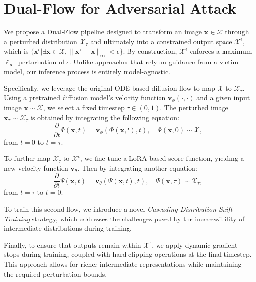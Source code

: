 \section{Dual-Flow for Adversarial Attack}


We propose a Dual-Flow pipeline designed to transform an image $\mathbf{x} \in \mathcal{X}$ through a perturbed distribution $\mathcal{X}_\tau$ and ultimately into a constrained output space $\mathcal{X}^\epsilon$, which is $\{\mathbf{x}^\epsilon | \exists \mathbf{x}\in \mathcal{X}, \|\mathbf{x^\epsilon - \mathbf{x}}\|_\infty < \epsilon\}$. By construction, $\mathcal{X}^\epsilon$ enforces a maximum $\ell_\infty$ perturbation of $\epsilon$. Unlike approaches that rely on guidance from a victim model, our inference process is entirely model-agnostic.

Specifically, we leverage the original ODE-based diffusion flow to map $\mathcal{X}$ to $\mathcal{X}_\tau$. Using a pretrained diffusion model's velocity function $\mathbf{v}_\phi(\cdot,\cdot)$ and a given input image $\mathbf{x} \sim \mathcal{X}$, we select a fixed timestep $\tau \in (0,1)$. The perturbed image $\mathbf{x}_\tau \sim \mathcal{X}_\tau$ is obtained by integrating the following equation:
\begin{equation}
    \frac{\partial}{\partial t}\Phi(\mathbf{x},t) = \mathbf{v}_\phi(\Phi(\mathbf{x},t), t), \quad \Phi(\mathbf{x}, 0) \sim \mathcal{X},
\label{forward ode}
\end{equation}
from $t = 0$ to $t = \tau$. 

To further map $\mathcal{X}_\tau$ to $\mathcal{X}^\epsilon$, we fine-tune a LoRA-based score function\cite{hu2021lora}, yielding a new velocity function $\mathbf{v}_\theta$. Then by integrating another equation:
\begin{equation}
    \frac{\partial}{\partial t}\Psi(\mathbf{x},t) = \mathbf{v}_\theta(\Psi(\mathbf{x},t), t), \quad \Psi(\mathbf{x}, \tau) \sim \mathcal{X}_\tau,
\label{reverse ode}
\end{equation}
from $t = \tau$ to $t = 0$. 

To train this second flow, we introduce a novel \emph{Cascading Distribution Shift Training} strategy, which addresses the challenges posed by the inaccessibility of intermediate distributions during training.

Finally, to ensure that outputs remain within $\mathcal{X}^\epsilon$, we apply dynamic gradient stops during training, coupled with hard clipping operations at the final timestep. This approach allows for richer intermediate representations while maintaining the required perturbation bounds.

